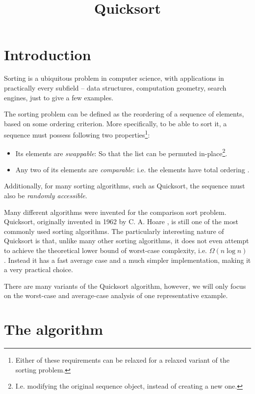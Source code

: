 \documentclass[]{finalproject}
\title{Quicksort}
\subtitle{}
\begin{document}
\maketitle

\section{Introduction} \label{introduction}

Sorting is a ubiquitous problem in computer science, with applications in practically every subfield -- data structures, computation geometry, search engines, just to give a few examples.

The sorting problem can be defined as the reordering of a sequence of elements, based on some ordering criterion. More specifically, to be able to sort it, a sequence must possess following two properties\footnote{Either of these requirements can be relaxed for a relaxed variant of the sorting problem.}:

\begin{itemize}
\item Its elements are \textit{swappable}: So that the list can be permuted in-place\footnote{I.e. modifying the original sequence object, instead of creating a new one.}.
\item Any two of its elements are \textit{comparable}: i.e. the elements have total ordering \cite{towiki}.
\end{itemize}

Additionally, for many sorting algorithms, such as Quicksort, the sequence must also be \textit{randomly accessible}.

Many different algorithms were invented for the comparison sort problem. Quicksort, originally invented in 1962 by C. A. Hoare \cite{hoare1962quicksort}, is still one of the most commonly used sorting algorithms. The particularly interesting nature of Quicksort is that, unlike many other sorting algorithms, it does not even attempt to achieve the theoretical lower bound of worst-case complexity, i.e. $\Omega(n\log n)$ \cite[p.~193]{clrs}. Instead it has a fast average case and a much simpler implementation, making it a very practical choice.

There are many variants of the Quicksort algorithm, however, we will only focus on the worst-case and average-case analysis of one representative example.

\section{The algorithm}
\end{document}
